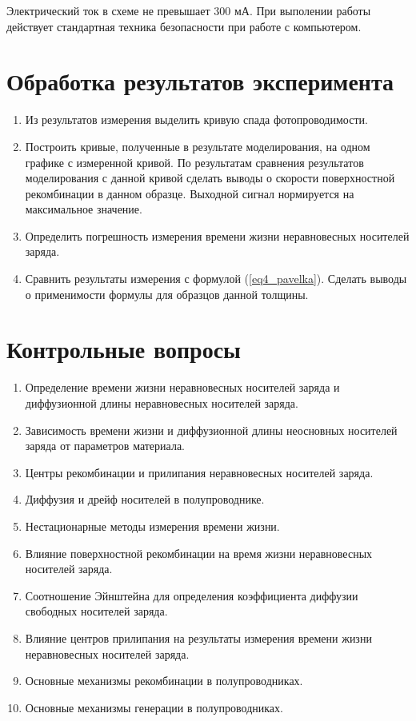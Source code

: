 Электрический ток в схеме не превышает 300 мА. При выполении работы действует стандартная техника безопасности при работе с компьютером.

\section{Обработка результатов эксперимента}

\begin{enumerate}
\item Из результатов измерения выделить кривую спада фотопроводимости.
\item Построить кривые, полученные в результате моделирования, на одном графике с измеренной кривой. По результатам сравнения результатов моделирования с данной кривой сделать выводы о скорости поверхностной рекомбинации в данном образце. Выходной сигнал нормируется на максимальное значение.
\item Определить погрешность измерения времени жизни неравновесных носителей заряда.
\item Сравнить результаты измерения с формулой (\ref{eq4_pavelka}). Сделать выводы о применимости формулы для образцов данной толщины.
\end{enumerate}

\section{Контрольные вопросы}

\begin{enumerate}
\item Определение времени жизни неравновесных носителей заряда и диффузионной длины неравновесных носителей заряда.
\item Зависимость времени жизни и диффузионной длины неосновных носителей заряда от параметров материала.
\item Центры рекомбинации и прилипания неравновесных носителей заряда.
\item Диффузия и дрейф носителей в полупроводнике.
\item Нестационарные методы измерения времени жизни.
\item Влияние поверхностной рекомбинации на время жизни неравновесных носителей заряда.
\item Соотношение Эйнштейна для определения коэффициента диффузии свободных носителей заряда.
\item Влияние центров прилипания на результаты измерения времени жизни неравновесных носителей заряда.
\item Основные механизмы рекомбинации в полупроводниках.
\item Основные механизмы генерации в полупроводниках.
\end{enumerate}

